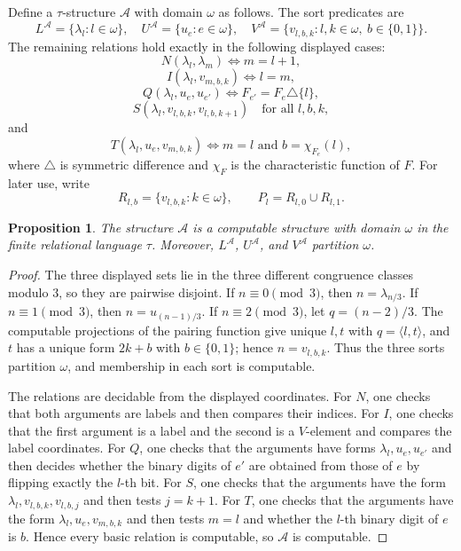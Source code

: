\documentclass[12pt]{article}
\newtheorem{proposition}[theorem]{Proposition}
\theoremstyle{definition}
\theoremstyle{remark}
\begin{document}
Define a \(\tau\)-structure \(\mathcal A\) with domain \(\omega\) as follows.  The sort predicates are
\[
L^{\mathcal A}=\{\lambda_l:l\in\omega\},\quad
U^{\mathcal A}=\{u_e:e\in\omega\},\quad
V^{\mathcal A}=\{v_{l,b,k}:l,k\in\omega,\ b\in\{0,1\}\}.
\]
The remaining relations hold exactly in the following displayed cases:
\[
N(\lambda_l,\lambda_m)\Longleftrightarrow m=l+1,
\]
\[
I(\lambda_l,v_{m,b,k})\Longleftrightarrow l=m,
\]
\[
Q(\lambda_l,u_e,u_{e'})\Longleftrightarrow F_{e'}=F_e\triangle\{l\},
\]
\[
S(\lambda_l,v_{l,b,k},v_{l,b,k+1})
\quad\text{for all }l,b,k,
\]
and
\[
T(\lambda_l,u_e,v_{m,b,k})
\Longleftrightarrow
m=l\text{ and }b=\chi_{F_e}(l),
\]
where \(\triangle\) is symmetric difference and \(\chi_F\) is the characteristic function of \(F\).  For later use, write
\[
R_{l,b}=\{v_{l,b,k}:k\in\omega\},
\qquad
P_l=R_{l,0}\cup R_{l,1}.
\]

\begin{proposition}\label{prop:construction}
The structure \(\mathcal A\) is a computable structure with domain \(\omega\) in the finite relational language \(\tau\).  Moreover, \(L^{\mathcal A}\), \(U^{\mathcal A}\), and \(V^{\mathcal A}\) partition \(\omega\).
\end{proposition}

\begin{proof}
The three displayed sets lie in the three different congruence classes modulo \(3\), so they are pairwise disjoint.  If \(n\equiv 0\pmod 3\), then \(n=\lambda_{n/3}\).  If \(n\equiv 1\pmod 3\), then \(n=u_{(n-1)/3}\).  If \(n\equiv 2\pmod 3\), let \(q=(n-2)/3\).  The computable projections of the pairing function give unique \(l,t\) with \(q=\langle l,t\rangle\), and \(t\) has a unique form \(2k+b\) with \(b\in\{0,1\}\); hence \(n=v_{l,b,k}\).  Thus the three sorts partition \(\omega\), and membership in each sort is computable.

The relations are decidable from the displayed coordinates.  For \(N\), one checks that both arguments are labels and then compares their indices.  For \(I\), one checks that the first argument is a label and the second is a \(V\)-element and compares the label coordinates.  For \(Q\), one checks that the arguments have forms \(\lambda_l,u_e,u_{e'}\) and then decides whether the binary digits of \(e'\) are obtained from those of \(e\) by flipping exactly the \(l\)-th bit.  For \(S\), one checks that the arguments have the form \(\lambda_l,v_{l,b,k},v_{l,b,j}\) and then tests \(j=k+1\).  For \(T\), one checks that the arguments have the form \(\lambda_l,u_e,v_{m,b,k}\) and then tests \(m=l\) and whether the \(l\)-th binary digit of \(e\) is \(b\).  Hence every basic relation is computable, so \(\mathcal A\) is computable.
\end{proof}
\end{document}

